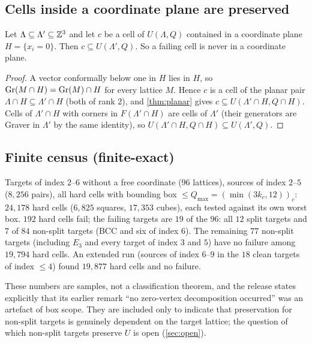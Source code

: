 \subsection{Cells inside a coordinate plane are preserved}
\begin{theorem}\label{thm:F1}
Let $\Lambda\subseteq\Lambda'\subseteq\mathbb Z^3$ and let $c$ be a cell of $U(\Lambda,Q)$ contained in a coordinate plane $H=\{x_i=0\}$. Then $c\subseteq U(\Lambda',Q)$. So a failing cell is never in a coordinate plane.
\end{theorem}
\begin{proof}
A vector conformally below one in $H$ lies in $H$, so $\operatorname{Gr}(M\cap H)=\operatorname{Gr}(M)\cap H$ for every lattice $M$. Hence $c$ is a cell of the planar pair $\Lambda\cap H\subseteq\Lambda'\cap H$ (both of rank $2$), and \cref{thm:planar} gives $c\subseteq U(\Lambda'\cap H,Q\cap H)$. Cells of $\Lambda'\cap H$ with corners in $F(\Lambda'\cap H)$ are cells of $\Lambda'$ (their generators are Graver in $\Lambda'$ by the same identity), so $U(\Lambda'\cap H,Q\cap H)\subseteq U(\Lambda',Q)$. \qedhere
\end{proof}

\subsection{Finite census (finite-exact)}
\begin{proposition}\label{prop:census}
Targets of index $2$--$6$ without a free coordinate ($96$ lattices), sources of index $2$--$5$ ($8{,}256$ pairs), all hard cells with bounding box $\le Q_{\max}=(\min(3k_c,12))_c$: $24{,}178$ hard cells ($6{,}825$ squares, $17{,}353$ cubes), each tested against its own worst box. $192$ hard cells fail; the failing targets are $19$ of the $96$: all $12$ split targets and $7$ of $84$ non-split targets (BCC and six of index $6$). The remaining $77$ non-split targets (including $E_3$ and every target of index $3$ and $5$) have no failure among $19{,}794$ hard cells. An extended run (sources of index $6$--$9$ in the $18$ clean targets of index $\le4$) found $19{,}877$ hard cells and no failure.
\end{proposition}
\noindent These numbers are samples, not a classification theorem, and the release states explicitly that its earlier remark ``no zero-vertex decomposition occurred'' was an artefact of box scope. They are included only to indicate that preservation for non-split targets is genuinely dependent on the target lattice; the question of which non-split targets preserve $U$ is open (\cref{sec:open}).
